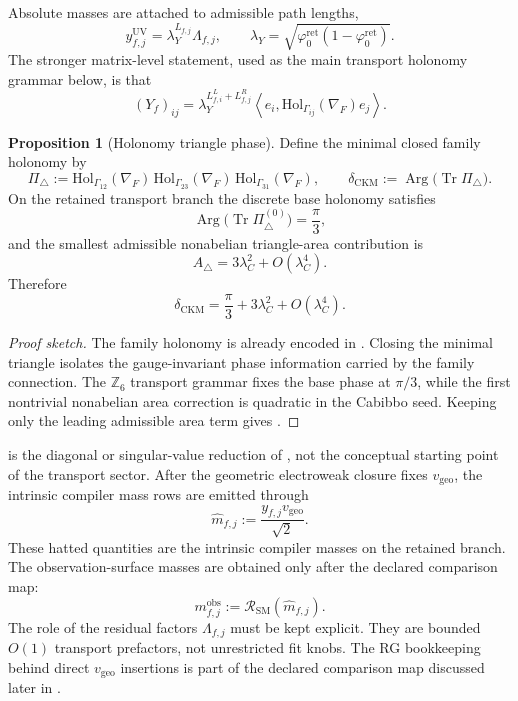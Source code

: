\documentclass[11pt,a4paper]{article}
\theoremstyle{definition}
\newtheorem{proposition}[theorem]{Proposition}
\theoremstyle{remark}
\DeclareMathOperator{\tr}{Tr}
\newcommand{\phiz}{\varphi_0^{\mathrm{ret}}}
\newcommand{\SM}{\mathrm{SM}}
\newcommand{\lambdaY}{\lambda_Y}
\newcommand{\vgeo}{v_{\mathrm{geo}}}
\begin{document}
Absolute masses are attached to admissible path lengths,
\begin{equation}
\label{eq:path-length-yukawa}
y_{f,j}^{\mathrm{UV}}=\lambdaY^{L_{f,j}}\Lambda_{f,j},
\qquad
\lambdaY=\sqrt{\phiz(1-\phiz)}.
\end{equation}
The stronger matrix-level statement, used as the main transport holonomy grammar below, is that
\begin{equation}
\label{eq:yukawa-holonomy-matrix}
(Y_f)_{ij}
=
\lambdaY^{L^L_{f,i}+L^R_{f,j}}
\left\langle e_i,\mathrm{Hol}_{\Gamma_{ij}}(\nabla_F)e_j\right\rangle.
\end{equation}
\begin{proposition}[Holonomy triangle phase]
\label{prop:holonomy-triangle-phase}
Define the minimal closed family holonomy by
\[
\Pi_\triangle
:=
\mathrm{Hol}_{\Gamma_{12}}(\nabla_F)\,
\mathrm{Hol}_{\Gamma_{23}}(\nabla_F)\,
\mathrm{Hol}_{\Gamma_{31}}(\nabla_F),
\qquad
\delta_{\mathrm{CKM}}
:=
\operatorname{Arg}\bigl(\tr\Pi_\triangle\bigr).
\]
On the retained transport branch the discrete base holonomy satisfies
\[
\operatorname{Arg}\bigl(\tr\Pi_\triangle^{(0)}\bigr)=\frac{\pi}{3},
\]
and the smallest admissible nonabelian triangle-area contribution is
\[
A_\triangle=3\lambda_C^2+O(\lambda_C^4).
\]
Therefore
\begin{equation}
\label{eq:ckm-holonomy-phase}
\delta_{\mathrm{CKM}}
=
\frac{\pi}{3}+3\lambda_C^2+O(\lambda_C^4).
\end{equation}
\end{proposition}

\begin{proof}[Proof sketch]
The family holonomy is already encoded in . Closing the minimal triangle isolates the gauge-invariant phase information carried by the family connection. The $\mathbb Z_6$ transport grammar fixes the base phase at $\pi/3$, while the first nontrivial nonabelian area correction is quadratic in the Cabibbo seed. Keeping only the leading admissible area term gives .
\end{proof}

 is the diagonal or singular-value reduction of , not the conceptual starting point of the transport sector.
After the geometric electroweak closure fixes $\vgeo$, the intrinsic compiler mass rows are emitted through
\begin{equation}
\label{eq:mass-bridge}
\hat m_{f,j}:=\frac{y_{f,j}\vgeo}{\sqrt2}.
\end{equation}
These hatted quantities are the intrinsic compiler masses on the retained branch. The observation-surface masses are obtained only after the declared comparison map:
\[
m_{f,j}^{\mathrm{obs}}:=\mathcal R_{\SM}(\hat m_{f,j}).
\]
The role of the residual factors $\Lambda_{f,j}$ must be kept explicit. They are bounded $O(1)$ transport prefactors, not unrestricted fit knobs. The RG bookkeeping behind direct $\vgeo$ insertions is part of the declared comparison map discussed later in .
\end{document}
